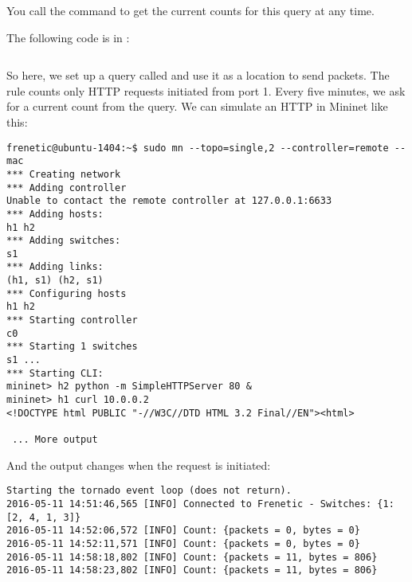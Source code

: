 You call the  command to get the current counts for this query at any time.

The following code is in :

\inputminted{python}{code/gathering_statistics/stats2.py}

So here, we set up a query called  and use it as a location to send packets.  The rule 
counts only HTTP requests initiated from port 1.  Every five minutes, we ask for a current count
from the query.  We can simulate an HTTP in Mininet like this:

\begin{verbatim}
frenetic@ubuntu-1404:~$ sudo mn --topo=single,2 --controller=remote --mac
*** Creating network
*** Adding controller
Unable to contact the remote controller at 127.0.0.1:6633
*** Adding hosts:
h1 h2
*** Adding switches:
s1
*** Adding links:
(h1, s1) (h2, s1)
*** Configuring hosts
h1 h2
*** Starting controller
c0
*** Starting 1 switches
s1 ...
*** Starting CLI:
mininet> h2 python -m SimpleHTTPServer 80 &
mininet> h1 curl 10.0.0.2
<!DOCTYPE html PUBLIC "-//W3C//DTD HTML 3.2 Final//EN"><html>

 ... More output 
\end{verbatim}

And the output changes when the request is initiated:

\begin{verbatim}
Starting the tornado event loop (does not return).
2016-05-11 14:51:46,565 [INFO] Connected to Frenetic - Switches: {1: [2, 4, 1, 3]}
2016-05-11 14:52:06,572 [INFO] Count: {packets = 0, bytes = 0}
2016-05-11 14:52:11,571 [INFO] Count: {packets = 0, bytes = 0}
2016-05-11 14:58:18,802 [INFO] Count: {packets = 11, bytes = 806}
2016-05-11 14:58:23,802 [INFO] Count: {packets = 11, bytes = 806}
\end{verbatim}
